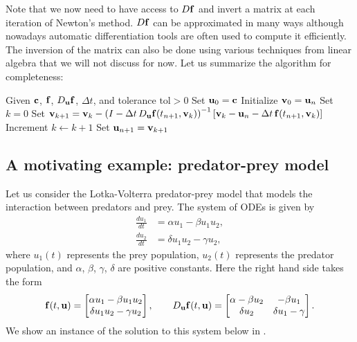 Note that we now need to have access to $D\mathbf{f}$ and invert a matrix at 
each iteration of Newton's method. $D \mathbf{f}$ can be approximated in many 
ways although nowadays automatic differentiation tools are often used to 
compute it efficiently. The inversion of the matrix can also be done 
using various techniques from linear algebra that we will not discuss 
for now. Let us summarize the algorithm for completeness: 

\begin{algorithm}
\caption{Backward Euler with Newton Subiterations for Systems}\label{alg:backward_euler_newton_systems}
\begin{algorithmic}
\State Given $\mathbf{c}$, $\mathbf{f}$, $D_{\mathbf{u}}\mathbf{f}$, $\Delta t$, and tolerance $\text{tol} > 0$
\State Set $\mathbf{u}_0 = \mathbf{c}$ 
\State Initialize $\mathbf{v}_0 = \mathbf{u}_n$
\State Set $k = 0$
\Repeat
    \State Set $\mathbf{v}_{k+1} = \mathbf{v}_k - \left( I - \Delta t \, D_{\mathbf{u}} \mathbf{f}(t_{n+1}, \mathbf{v}_k) \right)^{-1} \left[ \mathbf{v}_k - \mathbf{u}_n - \Delta t \, \mathbf{f}(t_{n+1}, \mathbf{v}_k) \right]$
    \State Increment $k \gets k+1$
\State Set $\mathbf{u}_{n+1} = \mathbf{v}_{k+1}$
\EndFor
\end{algorithmic}
\end{algorithm}

\subsection{A motivating example: predator-prey model}
Let us consider the Lotka-Volterra predator-prey model that models the interaction between predators and prey. The system of ODEs is given by
\begin{equation*}
    \begin{aligned}
    \frac{du_1}{dt} & = \alpha u_1 - \beta u_1 u_2, \\
    \frac{du_2}{dt} & = \delta u_1 u_2 - \gamma u_2,
    \end{aligned}
\end{equation*}
where $u_1(t)$ represents the prey population, $u_2(t)$ represents the 
predator population, and $\alpha$, $\beta$, $\gamma$, $\delta$ are 
positive constants. Here the right hand side takes the form 
\begin{equation*}
    \mathbf{f}(t, \mathbf{u}) = \begin{bmatrix}
    \alpha u_1 - \beta u_1 u_2 \\
    \delta u_1 u_2 - \gamma u_2
    \end{bmatrix}, 
    \qquad D_{\mathbf{u}} \mathbf{f}(t, \mathbf{u}) = \begin{bmatrix}
    \alpha - \beta u_2 & -\beta u_1 \\
    \delta u_2 & \delta u_1 - \gamma
    \end{bmatrix}.
\end{equation*}
We show an instance of the solution to this system below in .

